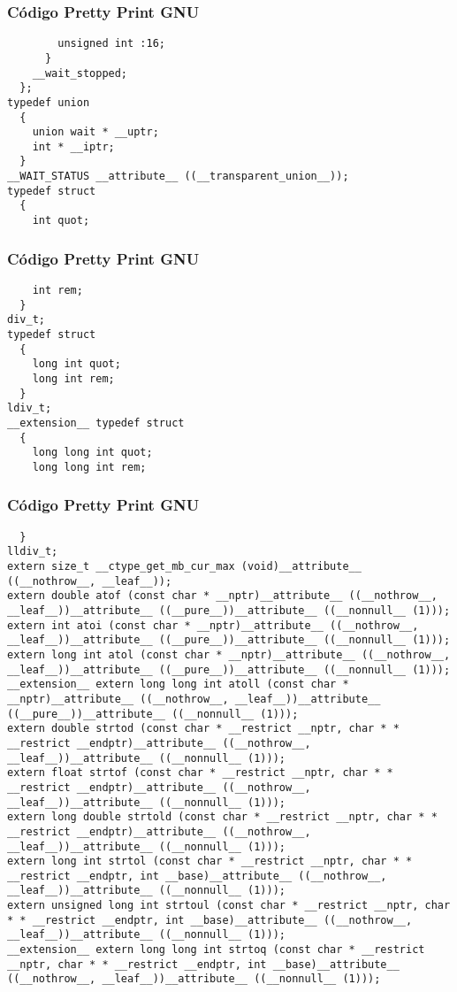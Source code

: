 \documentclass{beamer}
\begin{document}
\begin{frame}[fragile]
\frametitle{C\'odigo Pretty Print GNU}
\begin{verbatim}
        unsigned int :16;
      }
    __wait_stopped;
  };
typedef union
  {
    union wait * __uptr;
    int * __iptr;
  }
__WAIT_STATUS __attribute__ ((__transparent_union__));
typedef struct
  {
    int quot;
\end{verbatim}
\end{frame}
\begin{frame}[fragile]
\frametitle{C\'odigo Pretty Print GNU}
\begin{verbatim}
    int rem;
  }
div_t;
typedef struct
  {
    long int quot;
    long int rem;
  }
ldiv_t;
__extension__ typedef struct
  {
    long long int quot;
    long long int rem;
\end{verbatim}
\end{frame}
\begin{frame}[fragile]
\frametitle{C\'odigo Pretty Print GNU}
\begin{verbatim}
  }
lldiv_t;
extern size_t __ctype_get_mb_cur_max (void)__attribute__ ((__nothrow__, __leaf__));
extern double atof (const char * __nptr)__attribute__ ((__nothrow__, __leaf__))__attribute__ ((__pure__))__attribute__ ((__nonnull__ (1)));
extern int atoi (const char * __nptr)__attribute__ ((__nothrow__, __leaf__))__attribute__ ((__pure__))__attribute__ ((__nonnull__ (1)));
extern long int atol (const char * __nptr)__attribute__ ((__nothrow__, __leaf__))__attribute__ ((__pure__))__attribute__ ((__nonnull__ (1)));
__extension__ extern long long int atoll (const char * __nptr)__attribute__ ((__nothrow__, __leaf__))__attribute__ ((__pure__))__attribute__ ((__nonnull__ (1)));
extern double strtod (const char * __restrict __nptr, char * * __restrict __endptr)__attribute__ ((__nothrow__, __leaf__))__attribute__ ((__nonnull__ (1)));
extern float strtof (const char * __restrict __nptr, char * * __restrict __endptr)__attribute__ ((__nothrow__, __leaf__))__attribute__ ((__nonnull__ (1)));
extern long double strtold (const char * __restrict __nptr, char * * __restrict __endptr)__attribute__ ((__nothrow__, __leaf__))__attribute__ ((__nonnull__ (1)));
extern long int strtol (const char * __restrict __nptr, char * * __restrict __endptr, int __base)__attribute__ ((__nothrow__, __leaf__))__attribute__ ((__nonnull__ (1)));
extern unsigned long int strtoul (const char * __restrict __nptr, char * * __restrict __endptr, int __base)__attribute__ ((__nothrow__, __leaf__))__attribute__ ((__nonnull__ (1)));
__extension__ extern long long int strtoq (const char * __restrict __nptr, char * * __restrict __endptr, int __base)__attribute__ ((__nothrow__, __leaf__))__attribute__ ((__nonnull__ (1)));
\end{verbatim}
\end{frame}
\end{document}
